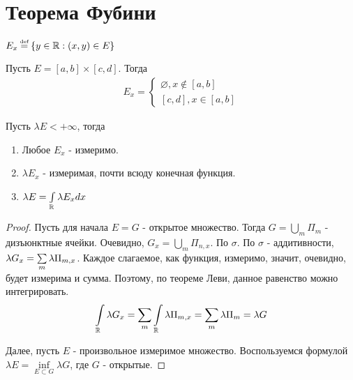 \section{Теорема Фубини}

\begin{definition}
    $E_x \defeq \set{y \in \mathbb{R} : (x, y) \in E}$
\end{definition}

\begin{example}
    Пусть $E = [a, b] \times [c, d]$. Тогда 
    \begin{gather*}
        E_x = 
        \left\{ \begin{matrix}
                \varnothing, x \notin [a,b] 
                \\ 
                [c, d], x \in [a, b]
        \end{matrix}\right.
    \end{gather*}
\end{example}

\begin{theorem}
    Пусть $\lambda E < +\infty$, тогда
    \begin{enumerate}
        \item 
            Любое $E_x$ - измеримо.
        \item
            $\lambda E_x$ - измеримая, почти всюду конечная функция. 
        \item
            $\lambda E = \int\limits_{\mathbb{R}} \lambda E_x dx$
    \end{enumerate}
\end{theorem}

\begin{proof}
    Пусть для начала $E = G$ - открытое множество. Тогда $G = \bigcup\limits_{m} \Pi_m$ - дизъюнктные ячейки. 
    Очевидно, $G_x = \bigcup\limits_{m} \Pi_{n, x}$. По $\sigma$. По $\sigma$ - аддитивности, $\lambda G_x = \sum\limits_{m}\lambda \Pi_{m, x}$.
    Каждое слагаемое, как функция, измеримо, значит, очевидно, будет измерима и сумма. 
    Поэтому, по теореме Леви, данное равенство можно интегрировать. 
    \begin{gather*}
        \int\limits_{\mathbb{R}} \lambda G_x = \sum\limits_{m} \int\limits_{\mathbb{R}} \lambda \Pi_{m ,x} = \sum\limits_{m} \lambda \Pi_m = \lambda G
    \end{gather*}

    Далее, пусть $E$ - произвольное измеримое множество. Воспользуемся формулой $\lambda E = \inf\limits_{E \subset G} \lambda G$, где $G$ - открытые.
    \todo
\end{proof}

